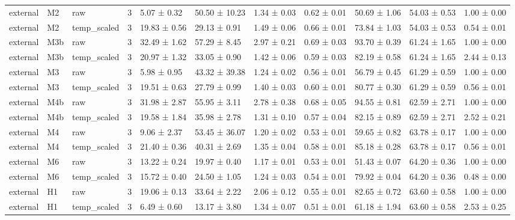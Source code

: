 \begin{tabular}{lllrlllllll}
external & M2 & raw & 3 & 5.07 ± 0.32 & 50.50 ± 10.23 & 1.34 ± 0.03 & 0.62 ± 0.01 & 50.69 ± 1.06 & 54.03 ± 0.53 & 1.00 ± 0.00 \\
external & M2 & temp\_scaled & 3 & 19.83 ± 0.56 & 29.13 ± 0.91 & 1.49 ± 0.06 & 0.66 ± 0.01 & 73.84 ± 1.03 & 54.03 ± 0.53 & 0.54 ± 0.01 \\
external & M3b & raw & 3 & 32.49 ± 1.62 & 57.29 ± 8.45 & 2.97 ± 0.21 & 0.69 ± 0.03 & 93.70 ± 0.39 & 61.24 ± 1.65 & 1.00 ± 0.00 \\
external & M3b & temp\_scaled & 3 & 20.97 ± 1.32 & 33.05 ± 0.90 & 1.42 ± 0.06 & 0.59 ± 0.03 & 82.19 ± 0.58 & 61.24 ± 1.65 & 2.44 ± 0.13 \\
external & M3 & raw & 3 & 5.98 ± 0.95 & 43.32 ± 39.38 & 1.24 ± 0.02 & 0.56 ± 0.01 & 56.79 ± 0.45 & 61.29 ± 0.59 & 1.00 ± 0.00 \\
external & M3 & temp\_scaled & 3 & 19.51 ± 0.63 & 27.79 ± 0.99 & 1.40 ± 0.03 & 0.60 ± 0.01 & 80.77 ± 0.30 & 61.29 ± 0.59 & 0.56 ± 0.01 \\
external & M4b & raw & 3 & 31.98 ± 2.87 & 55.95 ± 3.11 & 2.78 ± 0.38 & 0.68 ± 0.05 & 94.55 ± 0.81 & 62.59 ± 2.71 & 1.00 ± 0.00 \\
external & M4b & temp\_scaled & 3 & 19.58 ± 1.84 & 35.98 ± 2.78 & 1.31 ± 0.10 & 0.57 ± 0.04 & 82.15 ± 0.89 & 62.59 ± 2.71 & 2.52 ± 0.21 \\
external & M4 & raw & 3 & 9.06 ± 2.37 & 53.45 ± 36.07 & 1.20 ± 0.02 & 0.53 ± 0.01 & 59.65 ± 0.82 & 63.78 ± 0.17 & 1.00 ± 0.00 \\
external & M4 & temp\_scaled & 3 & 21.40 ± 0.36 & 40.31 ± 2.69 & 1.35 ± 0.04 & 0.58 ± 0.01 & 85.18 ± 0.28 & 63.78 ± 0.17 & 0.56 ± 0.01 \\
external & M6 & raw & 3 & 13.22 ± 0.24 & 19.97 ± 0.40 & 1.17 ± 0.01 & 0.53 ± 0.01 & 51.43 ± 0.07 & 64.20 ± 0.36 & 1.00 ± 0.00 \\
external & M6 & temp\_scaled & 3 & 15.72 ± 0.40 & 24.50 ± 1.05 & 1.24 ± 0.03 & 0.54 ± 0.01 & 79.92 ± 0.04 & 64.20 ± 0.36 & 0.48 ± 0.00 \\
external & H1 & raw & 3 & 19.06 ± 0.13 & 33.64 ± 2.22 & 2.06 ± 0.12 & 0.55 ± 0.01 & 82.65 ± 0.72 & 63.60 ± 0.58 & 1.00 ± 0.00 \\
external & H1 & temp\_scaled & 3 & 6.49 ± 0.60 & 13.17 ± 3.80 & 1.34 ± 0.07 & 0.51 ± 0.01 & 61.18 ± 1.94 & 63.60 ± 0.58 & 2.53 ± 0.25 \\
\bottomrule
\end{tabular}
